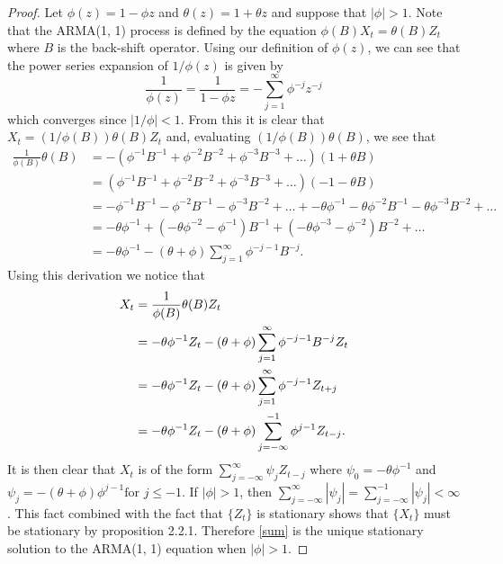\documentclass[12pt]{article}
\theoremstyle{definition}
\begin{document}
\begin{proof}
  Let $\phi(z) = 1 - \phi z$ and $\theta(z) = 1 + \theta z$
  and suppose that $|\phi| > 1$. Note that the ARMA(1, 1) process is defined
  by the equation $\phi(B)X_t = \theta(B)Z_t$ where $B$ is the back-shift
  operator. Using our definition of $\phi(z)$, we can see that the power series
  expansion of $1/\phi(z)$ is given by
  \[
    \frac{1}{\phi(z)} = \frac{1}{1-\phi z} = - \sum_{j=1}^{\infty} \phi^{-j}z^{-j}
  \]
  which converges since $|1/\phi|<1$. From this it is clear that
  $X_t = (1/\phi(B))\theta(B)Z_t$ and, evaluating $(1/\phi(B))\theta(B)$, we see that
  \begin{align*}
    \frac{1}{\phi(B)}\theta(B)
    &= -(\phi^{-1} B^{-1} + \phi^{-2} B^{-2} + \phi^{-3} B^{-3} + \dots )(1 + \theta B)\\
    &= (\phi^{-1} B^{-1} + \phi^{-2} B^{-2} + \phi^{-3} B^{-3} + \dots )(-1 - \theta B)\\
    &= -\phi^{-1}B^{-1} - \phi^{-2}B^{-1} - \phi^{-3}B^{-2} + \dots
    + -\theta\phi^{-1} - \theta\phi^{-2}B^{-1} - \theta\phi^{-3} B^{-2} + \dots\\
    &= -\theta\phi^{-1} + (-\theta\phi^{-2} - \phi^{-1})B^{-1} + (-\theta\phi^{-3} - \phi^{-2})B^{-2} + \dots\\
    &= -\theta\phi^{-1} - (\theta + \phi)\sum_{j=1}^{\infty} \phi^{-j-1}B^{-j}.
  \end{align*}
  Using this derivation we notice that
  \begin{align}
    X_t
    &= \frac{1}{\phi(B)}\theta(B) Z_t \notag \\
    &= -\theta\phi^{-1}Z_t - (\theta + \phi)\sum_{j=1}^{\infty} \phi^{-j-1}B^{-j} Z_t \notag \\
    &= -\theta\phi^{-1}Z_t - (\theta + \phi)\sum_{j=1}^{\infty} \phi^{-j-1}Z_{t+j} \notag \\
    &= -\theta\phi^{-1}Z_t - (\theta + \phi)\sum_{j=-\infty}^{-1} \phi^{j-1}Z_{t-j} \label{sum}.
  \end{align}
  It is then clear that $X_t$ is of the form $\sum_{j=-\infty}^\infty \psi_j Z_{t-j}$
  where $\psi_0 = -\theta\phi^{-1}$ and $\psi_j = -(\theta + \phi)\phi^{j-1} \text{for $j\leq -1$}$.
  If $|\phi|>1$, then $\sum_{j=-\infty}^\infty |\psi_j| =\sum_{j=-\infty}^{-1} |\psi_j| < \infty$. This fact
  combined with the fact that $\{Z_t\}$ is stationary shows that $\{X_t\}$ must be stationary by proposition 2.2.1.
  Therefore \eqref{sum} is the unique stationary solution to the ARMA(1, 1) equation when $|\phi| > 1$.
\end{proof}
\end{document}
